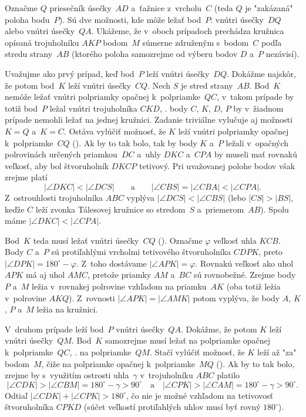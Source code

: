 {%
Označme $Q$ priesečník úsečky~$AD$ a~ťažnice z~vrcholu~$C$ (teda $Q$ je "zakázaná" poloha bodu~$P$). Sú dve možnosti, kde môže ležať bod~$P$: vnútri úsečky~$DQ$ alebo vnútri úsečky~$QA$. Ukážeme, že v~oboch prípadoch prechádza kružnica opísaná trojuholníku $AKP$ bodom~$M$ súmerne združeným s~bodom~$C$ podľa stredu strany~$AB$ (ktorého poloha samozrejme od výberu bodov $D$ a~$P$ nezávisí).

\smallskip
Uvažujme ako prvý prípad, keď bod~$P$ leží vnútri úsečky~$DQ$. Dokážme najskôr, že potom bod~$K$ leží vnútri úsečky~$CQ$. Nech $S$ je stred strany~$AB$. Bod~$K$ nemôže ležať vnútri polpriamky opačnej k~polpriamke~$QC$, v~takom prípade by totiž bod~$P$ ležal vnútri trojuholníka $CKD$, \tj. body $C$, $K$, $D$, $P$ by v~žiadnom prípade nemohli ležať na jednej kružnici. Zadanie triviálne vylučuje aj možnosti $K=Q$ a~$K=C$. Ostáva vylúčiť možnosť, že $K$ leží vnútri polpriamky opačnej k~polpriamke~$CQ$ (\obr).
%
Ak by to tak bolo, tak by body $K$ a~$P$ ležali v~opačných polrovinách určených priamkou~$DC$ a~uhly $DKC$ a~$CPA$ by museli mať rovnakú veľkosť, aby bol štvoruholník $DKCP$ tetivový. Pri uvažovanej polohe bodov však zrejme platí
$$
|\angle DKC|<|\angle DCS| \qquad\text{a}\qquad |\angle CBS|=|\angle CBA|<|\angle CPA|.
$$
Z~ostrouhlosti trojuholníka $ABC$ vyplýva $|\angle DCS|<|\angle CBS|$ (lebo $|CS|>|BS|$, keďže $C$ leží zvonka Tálesovej kružnice so stredom~$S$ a~priemerom~$AB$). Spolu máme $|\angle DKC|<|\angle CPA|$.

Bod~$K$ teda musí ležať vnútri úsečky~$CQ$ (\obr). Označme $\varphi$ veľkosť uhla $KCB$. Body $C$ a~$P$ sú protiľahlými vrcholmi tetivového štvoruholníka $CDPK$, preto $|\angle DPK|=180^\circ-\varphi$. Z~toho dostávame $|\angle APK|=\varphi$. Rovnakú veľkosť ako uhol $APK$ má aj uhol $AMC$, pretože priamky $AM$ a~$BC$ sú rovnobežné. Zrejme body $P$ a~$M$ ležia v~rovnakej polrovine vzhľadom na priamku~$AK$ (oba totiž ležia v~polrovine $AKQ$). Z~rovnosti $|\angle APK|=|\angle AMK|$ potom vyplýva, že body $A$, $K$, $P$ a~$M$ ležia na kružnici.
%

\smallskip
V~druhom prípade leží bod~$P$ vnútri úsečky~$QA$. Dokážme, že potom $K$ leží vnútri úsečky~$QM$. Bod~$K$ samozrejme musí ležať na polpriamke opačnej k~polpriamke~$QC$, \tj. na polpriamke~$QM$. Stačí vylúčiť možnosť, že $K$ leží až "za" bodom~$M$, čiže na polpriamke opačnej k~polpriamke~$MQ$ (\obr).
%
Ak by to tak bolo, zrejme by s~využitím ostrosti uhla~$\gamma$ v~trojuholníku $ABC$ platilo
$$
|\angle CDK|>|\angle CBM|=180^\circ-\gamma>90^\circ \quad\text{a}\quad
|\angle CPK|>|\angle CAM|=180^\circ-\gamma>90^\circ.
$$
Odtiaľ $|\angle CDK|+|\angle CPK|>180^\circ$, čo nie je možné vzhľadom na tetivovosť štvoruholníka $CPKD$ (súčet veľkostí protiľahlých uhlov musí byť rovný $180^\circ$).

}
